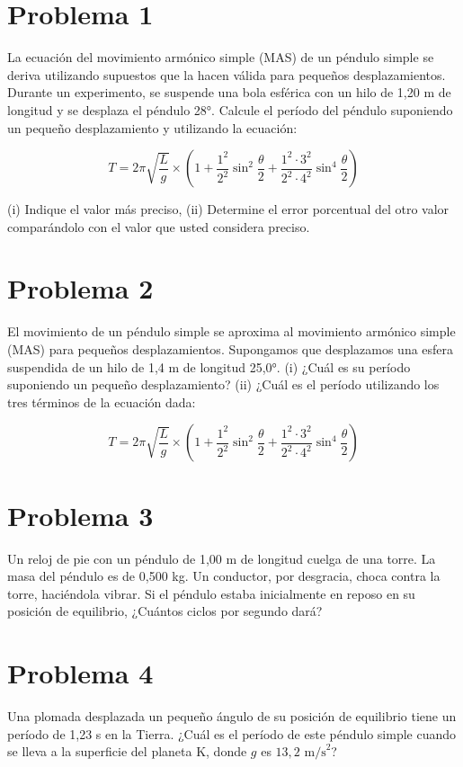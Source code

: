\documentclass[10pt,a4paper]{article}
\begin{document}
\section*{Problema 1}
La ecuación del movimiento armónico simple (MAS) de un péndulo simple se deriva utilizando supuestos que la hacen válida para pequeños desplazamientos. Durante un experimento, se suspende una bola esférica con un hilo de 1,20 m de longitud y se desplaza el péndulo 28°. Calcule el período del péndulo suponiendo un pequeño desplazamiento y utilizando la ecuación:

\[
T = 2\pi \sqrt{\frac{L}{g}} \times \left(1 + \frac{1^2}{2^2}\sin^2\frac{\theta}{2} + \frac{1^2 \cdot 3^2}{2^2 \cdot 4^2}\sin^4\frac{\theta}{2}\right)
\]

(i) Indique el valor más preciso, (ii) Determine el error porcentual del otro valor comparándolo con el valor que usted considera preciso.
\vspace{8cm}
\section*{Problema 2}
El movimiento de un péndulo simple se aproxima al movimiento armónico simple (MAS) para pequeños desplazamientos. Supongamos que desplazamos una esfera suspendida de un hilo de 1,4 m de longitud 25,0°. (i) ¿Cuál es su período suponiendo un pequeño desplazamiento? (ii) ¿Cuál es el período utilizando los tres términos de la ecuación dada:

\[
T = 2\pi \sqrt{\frac{L}{g}} \times \left(1 + \frac{1^2}{2^2}\sin^2\frac{\theta}{2} + \frac{1^2 \cdot 3^2}{2^2 \cdot 4^2}\sin^4\frac{\theta}{2}\right)
\]
\vspace{8cm}
\vspace{8cm}
\section*{Problema 3}
Un reloj de pie con un péndulo de 1,00 m de longitud cuelga de una torre. La masa del péndulo es de 0,500 kg. Un conductor, por desgracia, choca contra la torre, haciéndola vibrar. Si el péndulo estaba inicialmente en reposo en su posición de equilibrio, ¿Cuántos ciclos por segundo dará?
\vspace{6cm}
\section*{Problema 4}
Una plomada desplazada un pequeño ángulo de su posición de equilibrio tiene un período de 1,23 s en la Tierra. ¿Cuál es el período de este péndulo simple cuando se lleva a la superficie del planeta K, donde $g$ es $13,2 \text{ m/s}^2$?
\vspace{6cm}
\end{document}
